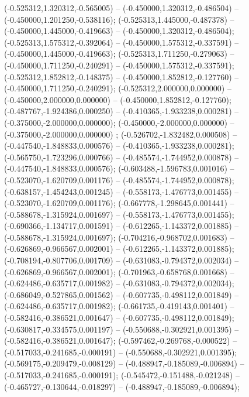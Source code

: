  (-0.525312,1.320312,-0.565005) -- (-0.450000,1.320312,-0.486504) -- (-0.450000,1.201250,-0.538116);
 (-0.525313,1.445000,-0.487378) -- (-0.450000,1.445000,-0.419663) -- (-0.450000,1.320312,-0.486504);
 (-0.525313,1.575312,-0.392064) -- (-0.450000,1.575312,-0.337591) -- (-0.450000,1.445000,-0.419663);
 (-0.525313,1.711250,-0.279063) -- (-0.450000,1.711250,-0.240291) -- (-0.450000,1.575312,-0.337591);
 (-0.525312,1.852812,-0.148375) -- (-0.450000,1.852812,-0.127760) -- (-0.450000,1.711250,-0.240291);
 (-0.525312,2.000000,0.000000) -- (-0.450000,2.000000,0.000000) -- (-0.450000,1.852812,-0.127760);
 (-0.487767,-1.924386,0.000250) -- (-0.410365,-1.933238,0.000281) -- (-0.375000,-2.000000,0.000000);
 (-0.450000,-2.000000,0.000000) -- (-0.375000,-2.000000,0.000000) ;
 (-0.526702,-1.832482,0.000508) -- (-0.447540,-1.848833,0.000576) -- (-0.410365,-1.933238,0.000281);
 (-0.565750,-1.723296,0.000766) -- (-0.485574,-1.744952,0.000878) -- (-0.447540,-1.848833,0.000576);
 (-0.603488,-1.596783,0.001016) -- (-0.523070,-1.620709,0.001176) -- (-0.485574,-1.744952,0.000878);
 (-0.638157,-1.454243,0.001245) -- (-0.558173,-1.476773,0.001455) -- (-0.523070,-1.620709,0.001176);
 (-0.667778,-1.298645,0.001441) -- (-0.588678,-1.315924,0.001697) -- (-0.558173,-1.476773,0.001455);
 (-0.690366,-1.134717,0.001591) -- (-0.612265,-1.143372,0.001885) -- (-0.588678,-1.315924,0.001697);
 (-0.704216,-0.968702,0.001683) -- (-0.626869,-0.966567,0.002001) -- (-0.612265,-1.143372,0.001885);
 (-0.708194,-0.807706,0.001709) -- (-0.631083,-0.794372,0.002034) -- (-0.626869,-0.966567,0.002001);
 (-0.701963,-0.658768,0.001668) -- (-0.624486,-0.635717,0.001982) -- (-0.631083,-0.794372,0.002034);
 (-0.686049,-0.527865,0.001562) -- (-0.607735,-0.498112,0.001849) -- (-0.624486,-0.635717,0.001982);
 (-0.661735,-0.419143,0.001401) -- (-0.582416,-0.386521,0.001647) -- (-0.607735,-0.498112,0.001849);
 (-0.630817,-0.334575,0.001197) -- (-0.550688,-0.302921,0.001395) -- (-0.582416,-0.386521,0.001647);
 (-0.597462,-0.269768,-0.000522) -- (-0.517033,-0.241685,-0.000191) -- (-0.550688,-0.302921,0.001395);
 (-0.569175,-0.209479,-0.008129) -- (-0.488947,-0.185089,-0.006894) -- (-0.517033,-0.241685,-0.000191);
 (-0.545472,-0.151488,-0.021248) -- (-0.465727,-0.130644,-0.018297) -- (-0.488947,-0.185089,-0.006894);
